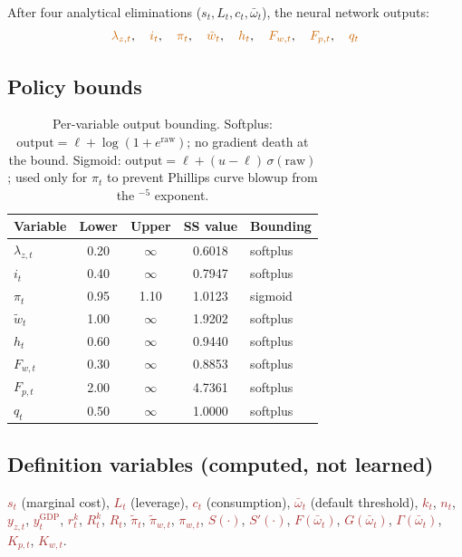 \documentclass[11pt]{article}
\begin{document}
After four analytical eliminations ($s_t, L_t, c_t, \bar\omega_t$), the neural
network outputs:
\[
  \textcolor{orange!80!black}{\lambda_{z,t}},\quad
  \textcolor{orange!80!black}{i_t},\quad
  \textcolor{orange!80!black}{\pi_t},\quad
  \textcolor{orange!80!black}{\tilde{w}_t},\quad
  \textcolor{orange!80!black}{h_t},\quad
  \textcolor{orange!80!black}{F_{w,t}},\quad
  \textcolor{orange!80!black}{F_{p,t}},\quad
  \textcolor{orange!80!black}{q_t}
\]

\subsection{Policy bounds}

\begin{table}[h]
\centering
\begin{tabular}{lcccl}
\toprule
Variable & Lower & Upper & SS value & Bounding \\
\midrule
$\lambda_{z,t}$ & 0.20 & $\infty$ & 0.6018 & softplus \\
$i_t$            & 0.40 & $\infty$ & 0.7947 & softplus \\
$\pi_t$          & 0.95 & 1.10     & 1.0123 & sigmoid \\
$\tilde{w}_t$    & 1.00 & $\infty$ & 1.9202 & softplus \\
$h_t$            & 0.60 & $\infty$ & 0.9440 & softplus \\
$F_{w,t}$        & 0.30 & $\infty$ & 0.8853 & softplus \\
$F_{p,t}$        & 2.00 & $\infty$ & 4.7361 & softplus \\
$q_t$            & 0.50 & $\infty$ & 1.0000 & softplus \\
\bottomrule
\end{tabular}
\caption{Per-variable output bounding. Softplus:
$\text{output} = \ell + \log(1+e^{\text{raw}})$; no gradient death at the bound.
Sigmoid: $\text{output} = \ell + (u-\ell)\,\sigma(\text{raw})$; used only for
$\pi_t$ to prevent Phillips curve blowup from the ${}^{-5}$ exponent.}
\end{table}

\subsection{Definition variables (computed, not learned)}

\textcolor{brown}{$s_t$} (marginal cost),
\textcolor{brown}{$L_t$} (leverage),
\textcolor{brown}{$c_t$} (consumption),
\textcolor{brown}{$\bar\omega_t$} (default threshold),
\textcolor{brown}{$k_t$},
\textcolor{brown}{$n_t$},
\textcolor{brown}{$y_{z,t}$},
\textcolor{brown}{$y_t^{\text{GDP}}$},
\textcolor{brown}{$r_t^k$},
\textcolor{brown}{$R_t^k$},
\textcolor{brown}{$R_t$},
\textcolor{brown}{$\tilde\pi_t$},
\textcolor{brown}{$\tilde\pi_{w,t}$},
\textcolor{brown}{$\pi_{w,t}$},
\textcolor{brown}{$S(\cdot)$},
\textcolor{brown}{$S'(\cdot)$},
\textcolor{brown}{$F(\bar\omega_t)$},
\textcolor{brown}{$G(\bar\omega_t)$},
\textcolor{brown}{$\Gamma(\bar\omega_t)$},
\textcolor{brown}{$K_{p,t}$},
\textcolor{brown}{$K_{w,t}$}.
\end{document}
